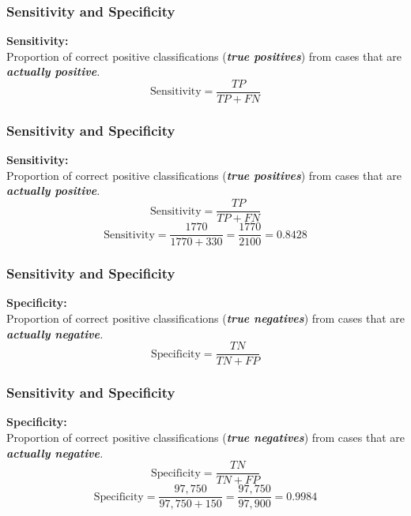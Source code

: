\documentclass{beamer}
\begin{document}
\begin{frame}
\frametitle{Sensitivity and Specificity}
\Large
\textbf{Sensitivity:} \\Proportion of correct positive classifications (\textit{\textbf{true positives}}) from cases that are \textit{\textbf{actually positive}.}
\[ \mbox{Sensitivity}=\frac{TP}{TP+FN}  \]
\phantom{Line1}
\phantom{Line1}
\end{frame}
\begin{frame}
\frametitle{Sensitivity and Specificity}
\Large
\textbf{Sensitivity:} \\Proportion of correct positive classifications (\textit{\textbf{true positives}}) from cases that are \textit{\textbf{actually positive}.}
\[ \mbox{Sensitivity}=\frac{TP}{TP+FN}  \]
\[ \mbox{Sensitivity}=\frac{1770}{1770 + 330} =\frac{1770}{2100}= 0.8428  \]
\end{frame}
\begin{frame}
\frametitle{Sensitivity and Specificity}
\Large
\textbf{Specificity:} \\Proportion of correct positive classifications (\textit{\textbf{true negatives}}) from cases that are \textit{\textbf{actually negative}.}
\[ \mbox{Specificity}=\frac{TN}{TN+FP}  \]
\phantom{Line1}
\phantom{Line1}
\end{frame}
\begin{frame}
\frametitle{Sensitivity and Specificity}
\Large
\textbf{Specificity:} \\Proportion of correct positive classifications (\textit{\textbf{true negatives}}) from cases that are \textit{\textbf{actually negative}.}
\[ \mbox{Specificity}=\frac{TN}{TN+FP}  \]
\[ \mbox{Specificity}=\frac{97,750}{97,750 + 150}=\frac{97,750}{97,900} = 0.9984  \]
\end{frame}
\end{document}
